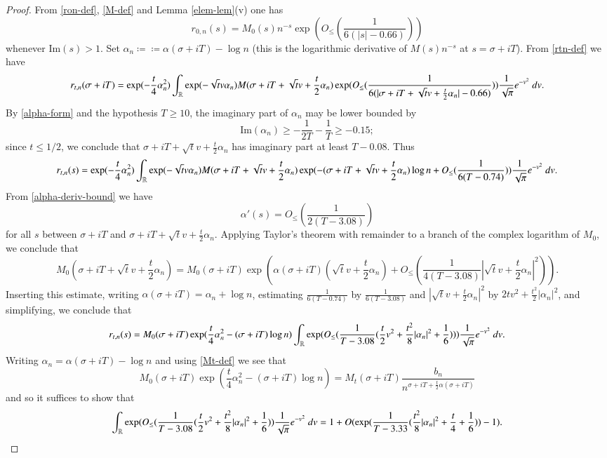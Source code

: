 \begin{proof}  From \eqref{ron-def}, \eqref{M-def} and Lemma \ref{elem-lem}(v) one has
$$ 
r_{0,n}(s) = M_0(s) n^{-s} \exp( O_{\leq}( \frac{1}{6(|s|-0.66)} ) )
$$
whenever $\mathrm{Im}(s) > 1$.  Set $\alpha_n \coloneqq \coloneqq \alpha(\sigma+iT) - \log n$ (this is the logarithmic derivative of $M(s) n^{-s}$ at $s=\sigma+iT$).  From \eqref{rtn-def} we have
$$
 r_{t,n}(\sigma+iT) = \exp( - \frac{t}{4} \alpha_n^2) \int_{\mathbb{R}} \exp( - \sqrt{t} v \alpha_n) M( \sigma + iT + \sqrt{t} v + \frac{t}{2} \alpha_n) 
\exp( O_{\leq}( \frac{1}{6(|\sigma+iT+\sqrt{t} v + \frac{t}{2} \alpha_n|-0.66)} ) )
\frac{1}{\sqrt{\pi}} e^{-v^2}\ dv.
$$
By \eqref{alpha-form} and the hypothesis $T \geq 10$, the imaginary part of $\alpha_n$ may be lower bounded by
$$ \mathrm{Im}(\alpha_n) \geq -\frac{1}{2T} - \frac{1}{T} \geq -0.15;$$
since $t \leq 1/2$, we conclude that $\sigma+iT+\sqrt{t} v + \frac{t}{2} \alpha_n$ has imaginary part at least $T - 0.08$.  Thus
$$
 r_{t,n}(s) = \exp( - \frac{t}{4} \alpha_n^2) \int_{\mathbb{R}} \exp( - \sqrt{t} v \alpha_n) M( \sigma + iT + \sqrt{t} v + \frac{t}{2} \alpha_n) \exp( -(\sigma+iT+\sqrt{t} v + \frac{t}{2} \alpha_n ) \log n + O_{\leq}( \frac{1}{6(T - 0.74)} ) )
\frac{1}{\sqrt{\pi}} e^{-v^2}\ dv.
$$
From \eqref{alpha-deriv-bound} we have
$$ \alpha'(s) = O_{\leq}( \frac{1}{2(T-3.08)} )$$
for all $s$ between $\sigma+iT$ and $\sigma + iT + \sqrt{t} v + \frac{t}{2} \alpha_n$.  Applying Taylor's theorem with remainder to a branch of the complex logarithm of $M_0$, we conclude that
$$ M_0( \sigma + iT + \sqrt{t} v + \frac{t}{2} \alpha_n) = M_0(\sigma+iT) \exp( \alpha(\sigma+iT) (\sqrt{t} v + \frac{t}{2} \alpha_n) + O_{\leq}( \frac{1}{4(T-3.08)} |\sqrt{t} v + \frac{t}{2} \alpha_n|^2 )).$$
Inserting this estimate, writing $\alpha(\sigma+iT) = \alpha_n + \log n$, estimating $\frac{1}{6(T-0.74)}$ by $\frac{1}{6(T-3.08)}$ and $|\sqrt{t} v + \frac{t}{2} \alpha_n|^2$ by $2tv^2 + \frac{t^2}{2} |\alpha_n|^2$, and simplifying, we conclude that
$$
 r_{t,n}(s) = M_0(\sigma+iT) \exp( \frac{t}{4} \alpha_n^2 - (\sigma+iT) \log n)
 \int_{\mathbb{R}} \exp(  O_{\leq}( \frac{1}{T-3.08} (\frac{t}{2}v^2 + \frac{t^2}{8} |\alpha_n|^2 + \frac{1}{6}) ) ) \frac{1}{\sqrt{\pi}} e^{-v^2}\ dv.$$
Writing $\alpha_n = \alpha(\sigma+iT) - \log n$ and using \eqref{Mt-def} we see that
$$ M_0(\sigma+iT) \exp( \frac{t}{4} \alpha_n^2 - (\sigma+iT) \log n) = M_t(\sigma+iT) \frac{b_n}{n^{\sigma+iT+\frac{t}{2} \alpha(\sigma+iT)}} $$
and so it suffices to show that
$$  \int_{\mathbb{R}} \exp(  O_{\leq}( \frac{1}{T-3.08} (\frac{t}{2}v^2 + \frac{t^2}{8} |\alpha_n|^2 + \frac{1}{6}) ) \frac{1}{\sqrt{\pi}} e^{-v^2}\ dv = 1 + O(\exp( \frac{1}{T-3.33} (\frac{t^2}{8} |\alpha_n|^2 + \frac{t}{4} + \frac{1}{6}))-1).$$

\end{proof}
